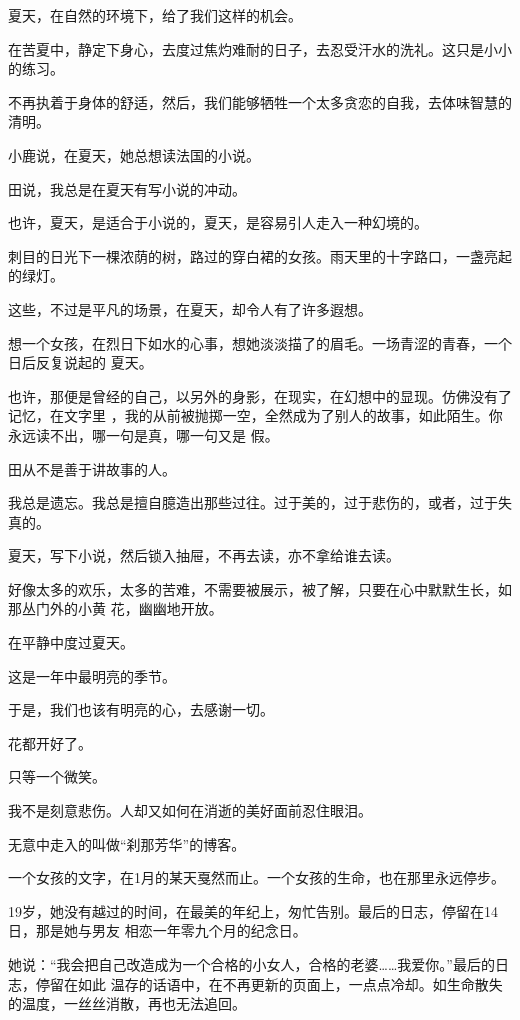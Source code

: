 \documentclass[12pt,a4paper]{article}
\begin{document}
		夏天，在自然的环境下，给了我们这样的机会。

		在苦夏中，静定下身心，去度过焦灼难耐的日子，去忍受汗水的洗礼。这只是小小的练习。\par
		不再执着于身体的舒适，然后，我们能够牺牲一个太多贪恋的自我，去体味智慧的清明。

		小鹿说，在夏天，她总想读法国的小说。\par
		田说，我总是在夏天有写小说的冲动。\par
		也许，夏天，是适合于小说的，夏天，是容易引人走入一种幻境的。\par
		刺目的日光下一棵浓荫的树，路过的穿白裙的女孩。雨天里的十字路口，一盏亮起的绿灯。\par
		这些，不过是平凡的场景，在夏天，却令人有了许多遐想。

		想一个女孩，在烈日下如水的心事，想她淡淡描了的眉毛。一场青涩的青春，一个日后反复说起的
	夏天。

		也许，那便是曾经的自己，以另外的身影，在现实，在幻想中的显现。仿佛没有了记忆，在文字里
	，我的从前被抛掷一空，全然成为了别人的故事，如此陌生。你永远读不出，哪一句是真，哪一句又是
	假。

		田从不是善于讲故事的人。\par
		我总是遗忘。我总是擅自臆造出那些过往。过于美的，过于悲伤的，或者，过于失真的。

		夏天，写下小说，然后锁入抽屉，不再去读，亦不拿给谁去读。

		好像太多的欢乐，太多的苦难，不需要被展示，被了解，只要在心中默默生长，如那丛门外的小黄
	花，幽幽地开放。

		在平静中度过夏天。\par
		这是一年中最明亮的季节。\par
		于是，我们也该有明亮的心，去感谢一切。\par
		花都开好了。\par
		只等一个微笑。

	\endwriting



		我不是刻意悲伤。人却又如何在消逝的美好面前忍住眼泪。

		无意中走入的叫做“刹那芳华”的博客。

		一个女孩的文字，在1月的某天戛然而止。一个女孩的生命，也在那里永远停步。

		19岁，她没有越过的时间，在最美的年纪上，匆忙告别。最后的日志，停留在14日，那是她与男友
	相恋一年零九个月的纪念日。

		她说：“我会把自己改造成为一个合格的小女人，合格的老婆……我爱你。”最后的日志，停留在如此
	温存的话语中，在不再更新的页面上，一点点冷却。如生命散失的温度，一丝丝消散，再也无法追回。
\end{document}
